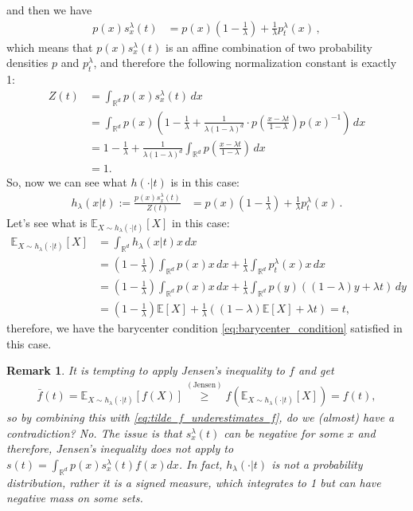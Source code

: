 \documentclass{article}
\theoremstyle{plain}
\theoremstyle{definition}
\theoremstyle{plain}
\newtheorem{remark}[theorem]{Remark}
\newcommand{\Rd}{\mathbb{R}^d}
\newcommand{\E}{\mathbb E}
\begin{document}
and then we have
\begin{align}
    p(x) s^\lambda_x(t)
     & = p(x) \left(1 - \frac{1}{\lambda}\right) + \frac{1}{\lambda} p^\lambda_t(x) \,,
\end{align}
which means that $p(x) s^\lambda_x(t)$ is an affine combination of two probability densities $p$ and $p^\lambda_t$,
and therefore the following normalization constant is exactly 1:
\begin{align}
    Z(t) & = \int_{\Rd} p(x) s^\lambda_x(t) \,dx                                                                                                                       \\
         & = \int_{\Rd} p(x) \left(1 - \frac{1}{\lambda} + \frac{1}{\lambda (1-\lambda)^d} \cdot p\left(\frac{x - \lambda t}{1 - \lambda}\right) p(x)^{-1}\right) \,dx \\
         & =
    1 - \frac{1}{\lambda} + \frac{1}{\lambda (1-\lambda)^d} \int_{\Rd} p\left(\frac{x - \lambda t}{1 - \lambda}\right) \,dx                                            \\
         & = 1.
\end{align}
So, now we can see what $h(\cdot|t)$ is in this case:
\begin{align}
    h_\lambda(x|t) := \frac{p(x) s^\lambda_x(t)}{Z(t)}
     & = p(x) \left(1 - \frac{1}{\lambda}\right) + \frac{1}{\lambda} p^\lambda_t(x) \,.
\end{align}
Let's see what is $\E_{X\sim h_\lambda(\cdot|t)}[X]$ in this case:
\begin{align}
    \E_{X\sim h_\lambda(\cdot|t)}[X]
     & = \int_{\Rd} h_\lambda(x|t) x \,dx
    \\
     & = \left(1 - \frac{1}{\lambda}\right) \int_{\Rd} p(x) x \,dx + \frac{1}{\lambda} \int_{\Rd} p_t^\lambda\left(x\right)  x \,dx
    \\
     & =
    \left(1 - \frac{1}{\lambda}\right)
    \int_{\Rd} p(x)  x \,dx
    + \frac{1}{\lambda}
    \int_{\Rd} p\left(y\right) \left(
    (1-\lambda) y + \lambda t
    \right) \,dy
    \\
     & = \left(
    1 - \frac{1}{\lambda}
    \right) \E[X] + \frac{1}{\lambda} \left(
    (1-\lambda) \E[X] + \lambda t
    \right)
    = t,
\end{align}
therefore, we have the barycenter condition \eqref{eq:barycenter_condition} satisfied in this case.
\begin{remark}
    It is tempting to apply Jensen's inequality to $f$ and get
    \begin{align}
        \bar{f}(t)
        = \E_{X\sim h_\lambda(\cdot|t)}[f(X)]
        \stackrel{(\text{Jensen})}{\geq}
        f\left(\E_{X\sim h_\lambda(\cdot|t)}[X]\right)
        = f(t),
    \end{align}
    so by combining this with \eqref{eq:tilde_f_underestimates_f}, do we (almost) have a contradiction?
    No.
    The issue is that $s^\lambda_x(t)$ can be negative for some $x$ and therefore,
    Jensen's inequality does not apply to $s(t) = \int_{\Rd} p(x) s^\lambda_x(t) f(x) dx$.
    In fact, $h_\lambda(\cdot|t)$ is not a probability distribution,
    rather it is a signed measure, which integrates to 1 but can have negative mass on some sets.
\end{remark}
\end{document}
